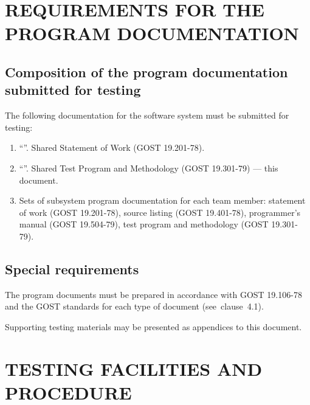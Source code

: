 \documentclass[12pt,a4paper]{extarticle}
\begin{document}
\section{REQUIREMENTS FOR THE PROGRAM DOCUMENTATION}

\subsection{Composition of the program documentation submitted for testing}


The following documentation for the software system must be submitted for testing:
\begin{enumerate}[label=\arabic*), leftmargin=1.25cm]
    \item \enquote{\projectname}. Shared Statement of Work (GOST 19.201-78).
    \item \enquote{\projectname}. Shared Test Program and Methodology
          (GOST 19.301-79) --- this document.
    \item Sets of subsystem program documentation for each team member:
          statement of work (GOST 19.201-78), source listing
          (GOST 19.401-78), programmer's manual (GOST 19.504-79), test
          program and methodology (GOST 19.301-79).
\end{enumerate}

\subsection{Special requirements}

The program documents must be prepared in accordance with GOST 19.106-78\cite{gost19106} and the GOST standards for each type of document (see~clause~4.1).

Supporting testing materials may be presented as appendices to this document.

\clearpage

\section{TESTING FACILITIES AND PROCEDURE}
\end{document}
